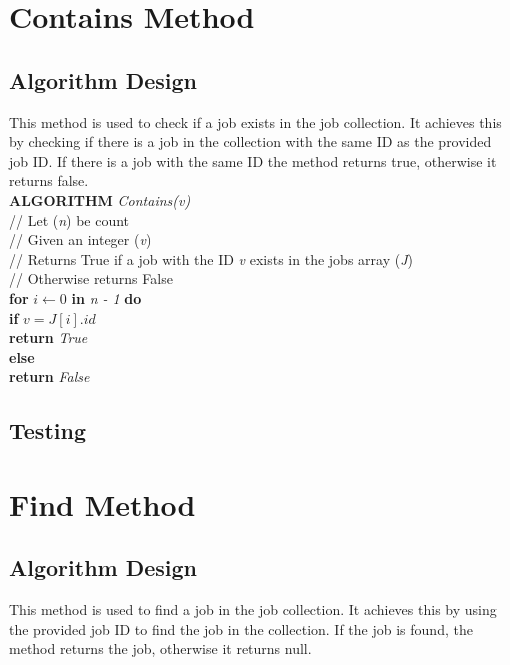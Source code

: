 \documentclass[12pt,a4paper]{article}
\begin{document}
	\newpage

	\section{Contains Method}
		\subsection{Algorithm Design}
			This method is used to check if a job exists in the job collection. It achieves this by 
			checking if there is a job in the collection with the same ID as the provided job ID. If there is 
			a job with the same ID the method returns true, otherwise it returns false.\\

			\textbf{ALGORITHM} \textit{Contains(v)}\\
			\null\hspace{1cm}// Let (\textit{n}) be count\\
			\null\hspace{1cm}// Given an integer (\textit{v})\\
			\null\hspace{1cm}// Returns True if a job with the ID \textit{v} exists in the jobs array (\textit{J})\\
			\null\hspace{1cm}// Otherwise returns False\\
			\null\hspace{1cm}\textbf{for} \textit{$i \gets 0$} \textbf{in} \textit{n - 1} \textbf{do}\\
			\null\hspace{2cm}\textbf{if} \textit{$v = J[i].id$}\\
			\null\hspace{3cm}\textbf{return} \textit{True}\\
			\null\hspace{1cm}\textbf{else}\\
			\null\hspace{2cm}\textbf{return} \textit{False}
			
		\subsection{Testing}


	\section{Find Method}
		\subsection{Algorithm Design}
			This method is used to find a job in the job collection. It achieves this by using the provided 
			job ID to find the job in the collection. If the job is found, the method returns the job, 
			otherwise it returns null.\\
\end{document}
